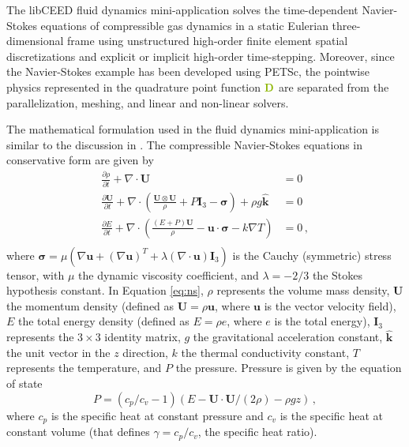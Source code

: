 The libCEED \cite{libceed-user-manual} fluid dynamics mini-application solves the time-dependent Navier-Stokes equations of compressible gas dynamics in a static Eulerian three-dimensional frame using unstructured high-order finite element spatial discretizations and explicit or implicit high-order time-stepping.
Moreover, since the Navier-Stokes example has been developed using PETSc, the pointwise physics represented in the quadrature point function ${\color{applegreen}\mathbf{D}}$ are separated from the parallelization, meshing, and linear and non-linear solvers.

The mathematical formulation used in the fluid dynamics mini-application is similar to the discussion in \cite{giraldoetal2010}.
The compressible Navier-Stokes equations in conservative form are given by
\begin{equation}
   \begin{aligned}
   \frac{\partial \rho}{\partial t} + \nabla \cdot \mathbf{U} &= 0 \\
   \frac{\partial \mathbf{U}}{\partial t} + \nabla \cdot \left( \frac{\mathbf{U} \otimes \mathbf{U}}{\rho} + P \mathbf{I}_3 - \mathbf\sigma \right) + \rho g \hat{\mathbf{k}} &= 0 \\
   \frac{\partial E}{\partial t} + \nabla \cdot \left( \frac{(E + P)\mathbf{U}}{\rho} -\mathbf{u} \cdot \mathbf{\sigma} - k \nabla T \right) &= 0 \, , \\
   \end{aligned}
\label{eq:ns}
\end{equation}
where $\boldsymbol{\sigma} = \mu \left( \nabla \mathbf{u} + \left( \nabla \mathbf{u} \right)^T + \lambda \left( \nabla \cdot \mathbf{u} \right) \mathbf{I}_3 \right)$ is the Cauchy (symmetric) stress tensor, with $\mu$ the dynamic viscosity coefficient, and $\lambda = - 2/3$ the Stokes hypothesis constant.
In Equation \ref{eq:ns}, $\rho$ represents the volume mass density, $\mathbf{U}$ the momentum density (defined as $\mathbf{U} = \rho \mathbf{u}$, where $\mathbf{u}$ is the vector velocity field), $E$ the total energy density (defined as $E = \rho e$, where $e$ is the total energy), $\mathbf{I}_3$ represents the $3 \times 3$ identity matrix, $g$ the gravitational acceleration constant, $\mathbf{\hat{k}}$ the unit vector in the $z$ direction, $k$ the thermal conductivity constant, $T$ represents the temperature, and $P$ the pressure.
Pressure is given by the equation of state
\begin{equation}
   P = \left( {c_p}/{c_v} -1\right) \left( E - {\mathbf{U} \cdot \mathbf{U}}/{(2 \rho)} - \rho g z \right) \, ,
   \label{eq:ns_state}
\end{equation}
where $c_p$ is the specific heat at constant pressure and $c_v$ is the specific heat at constant volume (that defines $\gamma = c_p / c_v$, the specific heat ratio).

